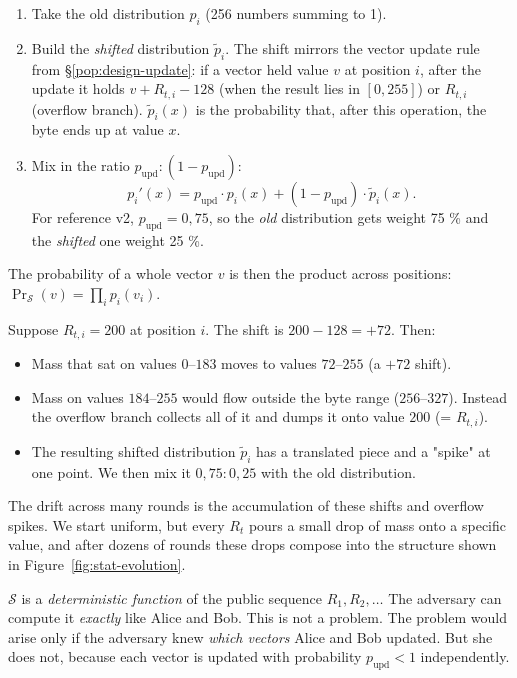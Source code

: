 \documentclass[11pt,a4paper]{article}
\begin{document}
\begin{enumerate}[leftmargin=*]
\item Take the old distribution $p_i$ (256 numbers summing to 1).
\item Build the \emph{shifted} distribution $\tilde{p}_i$. The shift mirrors the vector update rule from §\ref{pop:design-update}: if a vector held value $v$ at position $i$, after the update it holds $v + R_{t,i} - 128$ (when the result lies in $[0, 255]$) or $R_{t,i}$ (overflow branch). $\tilde{p}_i(x)$ is the probability that, after this operation, the byte ends up at value $x$.
\item Mix in the ratio $p_\text{upd} : (1 - p_\text{upd})$:
\[
p_i'(x) = p_\text{upd} \cdot p_i(x) + (1 - p_\text{upd}) \cdot \tilde{p}_i(x).
\]
For reference v2, $p_\text{upd} = 0{,}75$, so the \emph{old} distribution gets weight 75 \% and the \emph{shifted} one weight 25 \%.
\end{enumerate}

The probability of a whole vector $v$ is then the product across positions: $\Pr_\mathcal{S}(v) = \prod_i p_i(v_i)$.

\begin{sidebar}
Suppose $R_{t,i} = 200$ at position $i$. The shift is $200 - 128 = +72$. Then:
\begin{itemize}[leftmargin=*]
\item Mass that sat on values $0$--$183$ moves to values $72$--$255$ (a $+72$ shift).
\item Mass on values $184$--$255$ would flow outside the byte range ($256$--$327$). Instead the overflow branch collects all of it and dumps it onto value $200$ (= $R_{t,i}$).
\item The resulting shifted distribution $\tilde{p}_i$ has a translated piece and a "spike" at one point. We then mix it $0{,}75 : 0{,}25$ with the old distribution.
\end{itemize}
The drift across many rounds is the accumulation of these shifts and overflow spikes. We start uniform, but every $R_t$ pours a small drop of mass onto a specific value, and after dozens of rounds these drops compose into the structure shown in Figure~\ref{fig:stat-evolution}.
\end{sidebar}

\begin{aha}
$\mathcal{S}$ is a \emph{deterministic function} of the public sequence $R_1, R_2, \ldots$ The adversary can compute it \emph{exactly} like Alice and Bob. This is not a problem. The problem would arise only if the adversary knew \emph{which vectors} Alice and Bob updated. But she does not, because each vector is updated with probability $p_\text{upd} < 1$ independently.
\end{aha}
\end{document}
